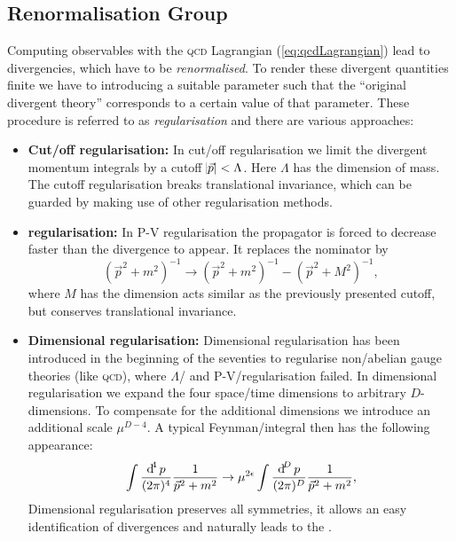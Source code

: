 \documentclass[../../index.tex]{subfiles}
\begin{document}
\subsection{Renormalisation Group}
Computing observables with the \textsc{qcd} Lagrangian (\cref{eq:qcdLagrangian})
lead to divergencies, which have to be \textit{renormalised}. To render these
divergent quantities finite we have to introducing a suitable parameter such
that the ``original divergent theory'' corresponds to a certain value of that
parameter. These procedure is referred to as \textit{regularisation} and there
are various approaches:
\begin{itemize}
\item \label{itm:lambdaRegularisation}\textbf{Cut\-/off regularisation:} In
  cut\-/off regularisation we limit the divergent momentum integrals by a cutoff
  $\abs{\vec p} < \Lambda$. Here $\Lambda$ has the dimension of mass.  The cutoff regularisation breaks translational
  invariance, which can be guarded by making use of other regularisation
  methods.
\item \textbf{ regularisation:} \cite{Pauli1949} In
  \textsc{P-V} regularisation the propagator is forced to decrease faster than
  the divergence to appear. It replaces the nominator by
  \begin{equation}
    (\vec p^2 + m^2)^{-1} \to (\vec p^2 + m^2)^{-1} - (\vec p^2 + M^2)^{-1},
  \end{equation}
  where $M$ has the dimension acts similar as the previously presented cutoff,
  but conserves translational invariance.
\item \textbf{Dimensional regularisation:}
  \cite{Bollini1972,tHooft1972,tHooft1973} Dimensional regularisation has been
  introduced in the beginning of the seventies to regularise non\-/abelian gauge
  theories (like \textsc{qcd}), where $\Lambda$\-/ and
  \textsc{P-V}\-/regularisation failed. In dimensional regularisation we expand
  the four space\-/time dimensions to arbitrary $D$-dimensions. To compensate
  for the additional dimensions we introduce an additional scale $\mu^{D-4}$. A
  typical Feynman\-/integral then has the following appearance:
  \begin{equation}
    \label{eq:dimRegFeynmanIntegral}
    \int \fdif{p} \frac{1}{\vec p^2 + m^2} \to \mu^{2\epsilon} \int \frac{\dif^D p}{(2\pi)^D}\frac{1}{\vec p^2+m^2},
  \end{equation}
  Dimensional regularisation preserves all symmetries, it allows an easy
  identification of divergences and naturally leads to the  \cite{tHooft1973,Weinberg1973a}.
\end{itemize}
\end{document}
